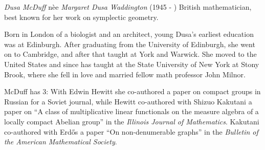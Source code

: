 \documentclass[12pt]{article}
\begin{document}

\emph{Dusa McDuff} n\`ee \emph{Margaret Dusa Waddington} (1945 - ) British mathematician, best known for her work on symplectic geometry.

Born in London of a biologist and an architect, young Dusa's earliest education was at Edinburgh. After graduating from the University of Edinburgh, she went on to Cambridge, and after that taught at York and Warwick. She moved to the United States and since has taught at the State University of New York at Stony Brook, where she fell in love and married fellow math professor John Milnor.

McDuff has  3: With Edwin Hewitt she co-authored a paper on compact groups in Russian for a Soviet journal, while Hewitt co-authored with Shizuo Kakutani a paper on ``A class of multiplicative linear functionals on the measure algebra of a locally compact Abelian group'' in the {\it Illinois Journal of Mathematics}. Kakutani co-authored with Erd\H{o}s a paper ``On non-denumerable graphs'' in the {\it Bulletin of the American Mathematical Society}.
\end{document}
